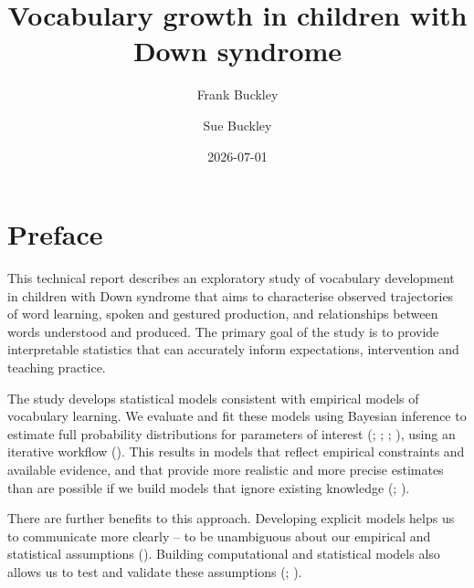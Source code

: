 \documentclass[
  11pt,
  a4paper,
]{report}
\title{Vocabulary growth in children with Down syndrome}
\author{Frank Buckley \and Sue Buckley}
\date{2026-07-01}
\renewcommand*\contentsname{Table of contents}
\newcommand\contentsname{Table of contents}
\begin{document}
\maketitle

\renewcommand*\contentsname{Table of contents}
{
\setcounter{tocdepth}{2}
\tableofcontents
}


\chapter*{Preface}\label{preface}


This technical report describes an exploratory study of vocabulary
development in children with Down syndrome that aims to characterise
observed trajectories of word learning, spoken and gestured production,
and relationships between words understood and produced. The primary
goal of the study is to provide interpretable statistics that can
accurately inform expectations, intervention and teaching practice.

The study develops statistical models consistent with empirical models
of vocabulary learning. We evaluate and fit these models using Bayesian
inference to estimate full probability distributions for parameters of
interest (; ;
;
), using an iterative workflow
(). This results in models that reflect empirical constraints and
available evidence, and that provide more realistic and more precise
estimates than are possible if we build models that ignore existing
knowledge (;
).

There are further benefits to this approach. Developing explicit models
helps us to communicate more clearly -- to be unambiguous about our
empirical and statistical assumptions
(). Building computational and statistical models also
allows us to test and validate these assumptions
(;
).
\end{document}
